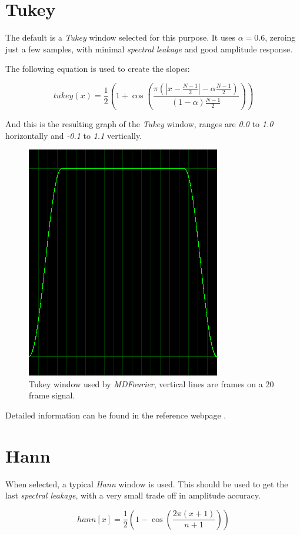 \documentclass[10pt,a4paper]{report}
\begin{document}
\begin{appendices}
\section{Tukey}

The default is a \textit{Tukey} window selected for this purpose. It uses $\alpha = 0.6$, zeroing just a few samples, with minimal \textit{spectral leakage} and good amplitude response.

The following equation is used to create the slopes:

\begin{equation}
tukey(x)=\frac{1}{2}(1+\cos(\frac{\pi(|x-\frac{N-1}{2}|-\alpha \frac{N-1}{2})}{(1-\alpha)\frac{N-1}{2}}))
\end{equation}

And this is the resulting graph of the \textit{Tukey} window, ranges are \textit{0.0} to \textit{1.0} horizontally and \textit{-0.1} to \textit{1.1} vertically.

\begin{figure}[H]
	\centering
	\includegraphics[width=0.4\linewidth]{images/windows/window-tukey.png}
	\caption[Tukey Window]{Tukey window used by \textit{MDFourier}, vertical lines are frames on a 20 frame signal.}
	\label{fig:window-tukey}
\end{figure}

Detailed information can be found in the reference webpage \cite{tukey}.

\section{Hann}
When selected, a typical \textit{Hann} window is used. This should be used to get the last \textit{spectral leakage}, with a very small trade off in amplitude accuracy.

\begin{equation}
hann[x] = \frac{1}{2}(1 - \cos(\frac{2\pi(x+1)}{n+1}))
\end{equation}


\end{appendices}
\end{document}
